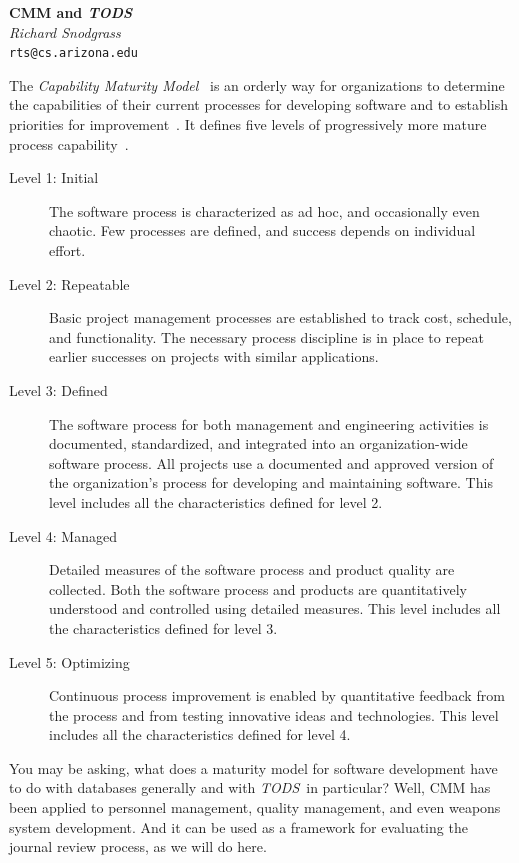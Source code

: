 \documentclass[11pt]{article}
\newcommand{\tods}{{\em TODS\/}}
\begin{document}
\begin{center}
{\Large\bf CMM and {\em TODS}}\\[2ex]
{\large\it  Richard Snodgrass}\\[1ex]
{\tt rts@cs.arizona.edu}\\[3ex]
\end{center}

The {\em Capability Maturity Model}~\cite{CMM} is an orderly way for
organizations to determine the capabilities of their current processes for
developing software and to establish priorities for improvement~\cite{Humphrey}. It
defines five levels of progressively more mature process
capability~\cite{Paulk}.

\begin{description}
\item[Level 1: Initial] The software process is characterized as ad hoc, and
  occasionally even chaotic. Few processes are defined, and success depends
  on individual effort.

\item[Level 2: Repeatable] Basic project management processes are
  established to track cost, schedule, and functionality. The necessary
  process discipline is in place to repeat earlier successes on projects
  with similar applications.

\item[Level 3: Defined] The software process for both management and
  engineering activities is documented, standardized, and integrated into an
  organization-wide software process. All projects use a documented and
  approved version of the organization's process for developing and
  maintaining software. This level includes all the characteristics defined
  for level 2.

\item[Level 4: Managed] Detailed measures of the software process and
  product quality are collected. Both the software process and products are
  quantitatively understood and controlled using detailed measures. This
  level includes all the characteristics defined for level 3.

\item[Level 5: Optimizing] Continuous process improvement is enabled by
  quantitative feedback from the process and from testing innovative ideas
  and technologies. This level includes all the characteristics defined
  for level 4.
\end{description}

You may be asking, what does a maturity model for software development have
to do with databases generally and with \tods\ in particular? Well, CMM has
been applied to personnel management, quality management, and even weapons
system development. And it can be used as a framework for evaluating the
journal review process, as we will do here.
\end{document}
